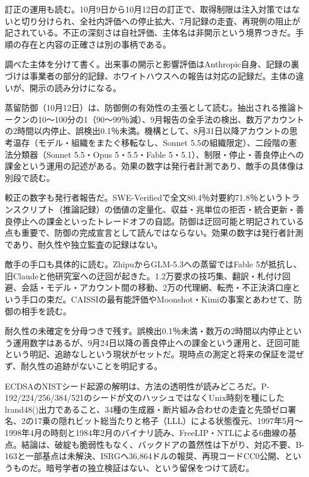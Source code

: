 \documentclass[lualatex,a4paper,10pt]{jlreq}
\begin{document}
訂正の運用も読む。10月9日から10月12日の訂正で、取得制限は注入対策ではないと切り分けられ、全社内評価への停止拡大、7月記録の走査、再現例の阻止が記されている。不正の深刻さは自社評価、主体名は非開示という境界つきだ。手順の存在と内容の正確さは別の事柄である。
\cite{B40,B79}


調べた主体を分けて書く。出来事の開示と影響評価はAnthropic自身、記録の裏づけは事業者の部分的記録、ホワイトハウスへの報告は対応の記録だ。主体の違いが、開示の読み分けになる。
\cite{B40,B79}


蒸留防御（10月12日）は、防御側の有効性の主張として読む。抽出される推論トークンの10〜100分の1（90〜99％減）、9月報告の全手法の検出、数万アカウントの2時間以内停止、誤検出0.1％未満。機構として、8月31日以降アカウントの思考温存（モデル・組織をまたぐ移転なし、Sonnet 5.5の組織限定）、二段階の憲法分類器（Sonnet 5.5・Opus 5・5.5・Fable 5・5.1）、制限・停止・善良停止への課金という運用の記述がある。効果の数字は発行者計測であり、敵手の具体像は別段で読む。
\cite{B41,B80}


較正の数字も発行者報告だ。SWE-Verifiedで全文80.4％対要約71.8％というトランスクリプト（推論記録）の価値の定量化、収益・兆単位の拒否・統合更新・善良停止への課金といったトレードオフの自認。防御は迂回可能と明記されている点も重要で、防御の完成宣言として読んではならない。効果の数字は発行者計測であり、耐久性や独立監査の記録はない。
\cite{B41,B80}


敵手の手口も具体的に読む。ZhipuからGLM-5.3への蒸留ではFable 5が抵抗し、旧Claudeと他研究室への迂回が起きた。1.2万要求の技巧集、翻訳・札付け回避、会話・モデル・アカウント間の移動、2万の代理網、転売・不正決済口座という手口の束だ。CAISSIの最有能評価やMoonshot・Kimiの事案とあわせて、防御の相手を読む。
\cite{B41,B80}


耐久性の未確定を分母つきで残す。誤検出0.1％未満・数万の2時間以内停止という運用数字はあるが、9月24日以降の善良停止への課金という運用と、迂回可能という明記、追跡なしという現状がセットだ。現時点の測定と将来の保証を混ぜず、耐久性の追跡がないことを明記する。
\cite{B41,B80}


ECDSAのNISTシード起源の解明は、方法の透明性が読みどころだ。P-192/224/256/384/521のシードが文のハッシュではなくUnix時刻を種にしたlrand48()出力であること、34種の生成器・断片組み合わせの走査と先頭ゼロ署名、2の17乗の隠れビット総当たりと格子（LLL）による状態復元、1997年5月〜1998年4月の時刻と1984年2月のバイナリ読み、FreeLIP・NTLによる6曲線の基点。結論は、破綻も脆弱性もなく、バックドアの蓋然性は下がり、対応不要、B-163と一部基点は未解決、ISRGへ36,864ドルの報奨、再現コードCC0公開、というものだ。暗号学者の独立検証はない、という留保をつけて読む。
\cite{B42,B81}
\end{document}
